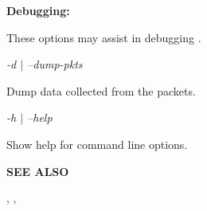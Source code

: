 {\bf Debugging:}

These options may assist in debugging .

\begin{description}

\item {\it -d $|$ --dump-pkts}\verb" "

Dump data collected from the packets.

\item {\it -h $|$ --help}\verb" "

Show help for command line options.

\end{description}

{\bf SEE ALSO}

,
,
